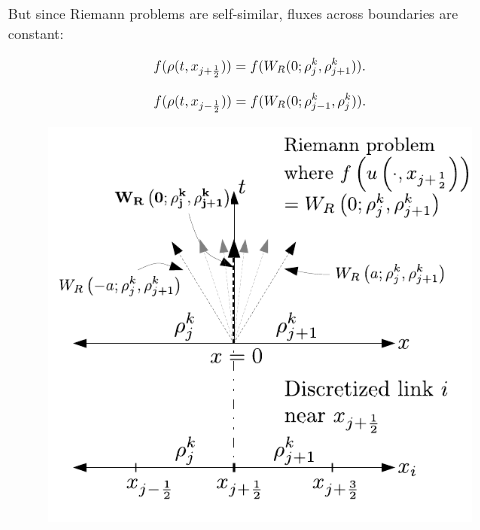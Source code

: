 \begin{frame}


But since Riemann problems are self-similar, fluxes across boundaries are constant:

\[
f(\rho(t,x_{j + \frac{1}{2}}))=f(W_{R}(0;\rho_{j}^{k},\rho_{j+1}^{k})).
\]

\[
f(\rho(t,x_{j-\frac{1}{2}}))=f(W_{R}(0;\rho_{j-1}^{k},\rho_{j}^{k})).
\]

\begin{figure}
\centering
\includegraphics[width=0.5\columnwidth]{../figs-gen/dx-to-riemann}
\end{figure}






\end{frame}

